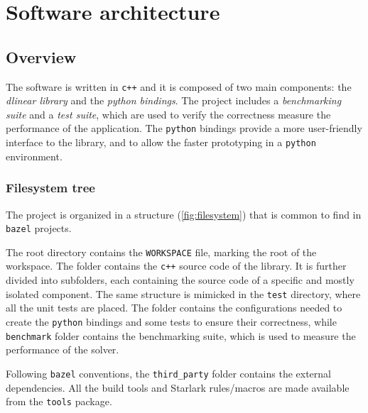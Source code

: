 \chapter{Software architecture}

\section{Overview}

The software is written in \texttt{c++} and it is composed of two main components: the \textit{dlinear library} and the \textit{python bindings}.
The project includes a \textit{benchmarking suite} and a \textit{test suite}, which are used to verify the correctness measure the performance of the application.
The \texttt{python} bindings provide a more user-friendly interface to the library, and to allow the faster prototyping in a \texttt{python} environment.

\subsection*{Filesystem tree}

The project is organized in a structure (\autoref{fig:filesystem}) that is common to find in \texttt{bazel} projects.

The root directory contains the \texttt{WORKSPACE} file, marking the root of the workspace.
The \dlinear folder contains the \texttt{c++} source code of the library.
It is further divided into subfolders, each containing the source code of a specific and mostly isolated component.
The same structure is mimicked in the \texttt{test} directory, where all the unit tests are placed.
The \pydlinear folder contains the configurations needed to create the \texttt{python} bindings and some tests to ensure their correctness, while \texttt{benchmark} folder contains the benchmarking suite, which is used to measure the performance of the solver.

Following \texttt{bazel} conventions, the \texttt{third\_party} folder contains the external dependencies.
All the build tools and Starlark rules/macros are made available from the \texttt{tools} package.


